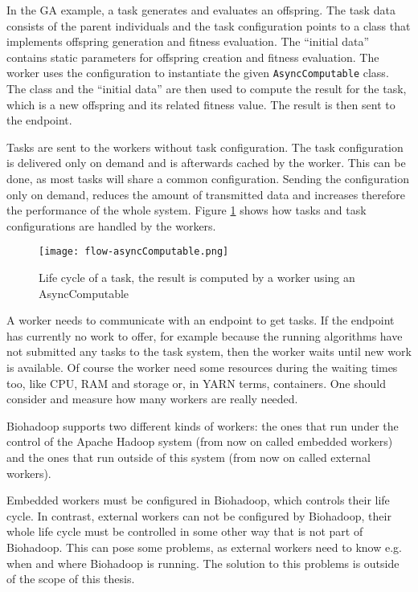 In the GA example, a task generates and evaluates an offspring. The task data consists of the parent individuals and the task configuration points to a class that implements offspring generation and fitness evaluation. The ``initial data'' contains static parameters for offspring creation and fitness evaluation. The worker uses the configuration to instantiate the given \texttt{AsyncComputable} class. The class and the ``initial data'' are then used to compute the result for the task, which is a new offspring and its related fitness value. The result is then sent to the endpoint.

Tasks are sent to the workers without task configuration. The task configuration is delivered only on demand and is afterwards cached by the worker. This can be done, as most tasks will share a common configuration. Sending the configuration only on demand, reduces the amount of transmitted data and increases therefore the performance of the whole system. Figure \ref{fig:async-computable} shows how tasks and task configurations are handled by the workers.

\begin{figure}[ht!]
  \centering
  \texttt{[image: flow-asyncComputable.png]}
  \caption{Life cycle of a task, the result is computed by a worker using an AsyncComputable}
  \label{fig:async-computable}
\end{figure}

A worker needs to communicate with an endpoint to get tasks. If the endpoint has currently no work to offer, for example because the running algorithms have not submitted any tasks to the task system, then the worker waits until new work is available. Of course the worker need some resources during the waiting times too, like CPU, RAM and storage or, in YARN terms, containers. One should consider and measure how many workers are really needed.

Biohadoop supports two different kinds of workers: the ones that run under the control of the Apache Hadoop system (from now on called embedded workers) and the ones that run outside of this system (from now on called external workers).

Embedded workers must be configured in Biohadoop, which controls their life cycle. In contrast, external workers can not be configured by Biohadoop, their whole life cycle must be controlled in some other way that is not part of Biohadoop. This can pose some problems, as external workers need to know e.g. when and where Biohadoop is running. The solution to this problems is outside of the scope of this thesis.

